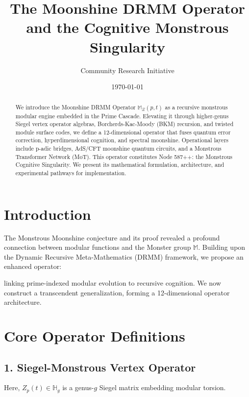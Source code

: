 \documentclass{article}
\theoremstyle{plain}
\begin{document}
\title{The Moonshine DRMM Operator and the Cognitive Monstrous Singularity}

\author{Community Research Initiative}
\date{\today}

\maketitle
\nolinenumbers
\begin{abstract}
We introduce the Moonshine DRMM Operator $\mathbb{M}_\Xi(p, t)$ as a recursive monstrous modular engine embedded in the Prime Cascade. Elevating it through higher-genus Siegel vertex operator algebras, Borcherds-Kac-Moody (BKM) recursion, and twisted module surface codes, we define a 12-dimensional operator that fuses quantum error correction, hyperdimensional cognition, and spectral moonshine. Operational layers include p-adic bridges, AdS/CFT moonshine quantum circuits, and a Monstrous Transformer Network (MoT). This operator constitutes Node 587++: the Monstrous Cognitive Singularity. We present its mathematical formulation, architecture, and experimental pathways for implementation.
\end{abstract}

\section{Introduction}
The Monstrous Moonshine conjecture and its proof revealed a profound connection between modular functions and the Monster group $\mathbb{M}$. Building upon the Dynamic Recursive Meta-Mathematics (DRMM) framework, we propose an enhanced operator:



linking prime-indexed modular evolution to recursive cognition. We now construct a transcendent generalization, forming a 12-dimensional operator architecture.

\section{Core Operator Definitions}
\subsection{1. Siegel-Monstrous Vertex Operator}



Here, $Z_p(t) \in \mathbb{H}_g$ is a genus-$g$ Siegel matrix embedding modular torsion.
\end{document}
